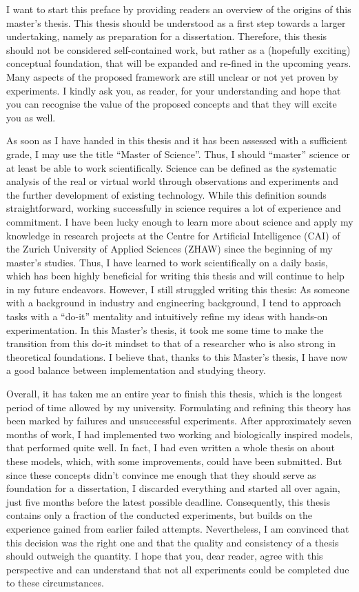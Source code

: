 \small
I want to start this preface by providing readers an overview of the origins of this master's thesis.
This thesis should be understood as a first step towards a larger undertaking, namely as preparation for a dissertation.
Therefore, this thesis should not be considered self-contained work, but rather as a (hopefully exciting) conceptual foundation,  that will be expanded and re-fined in the upcoming years.
Many aspects of the proposed framework are still unclear or not yet proven by experiments.
I kindly ask you, as reader, for your understanding and hope that you can recognise the value of the proposed concepts and that they will excite you as well.

As soon as I have handed in this thesis and it has been assessed with a sufficient grade, I may use the title ``Master of Science''.
Thus, I should ``master'' science or at least be able to work scientifically.
Science can be defined as the systematic analysis of the real or virtual world through observations and experiments and the further development of existing technology.
While this definition sounds straightforward, working successfully in science requires a lot of experience and commitment.
I have been lucky enough to learn more about science and apply my knowledge in research projects at the Centre for Artificial Intelligence (CAI) of the Zurich University of Applied Sciences (ZHAW) since the beginning of my master's studies.
Thus, I have learned to work scientifically on a daily basis, which has been highly beneficial for writing this thesis and will continue to help in my future endeavors.
However, I still struggled writing this thesis:
As someone with a background in industry and engineering background, I tend to approach tasks with a ``do-it'' mentality and intuitively refine my ideas with hands-on experimentation. 
In this Master's thesis, it took me some time to make the transition from this do-it mindset to that of a researcher who is also strong in theoretical foundations. I believe that, thanks to this Master's thesis, I have now a good balance between implementation and studying theory.

Overall, it has taken me an entire year to finish this thesis, which is the longest period of time allowed by my university.
Formulating and refining this theory has been marked by failures and unsuccessful experiments.
After approximately seven months of work, I had implemented two working and biologically inspired models, that performed quite well.
In fact, I had even written a whole thesis on about these models, which, with some improvements, could have been submitted.
But since these concepts didn't convince me enough that they should serve as foundation for a dissertation, I discarded everything and started all over again, just five months before the latest possible deadline.
Consequently, this thesis contains only a fraction of the conducted experiments, but builds on the experience gained from earlier failed attempts.
Nevertheless, I am convinced that this decision was the right one and that the quality and consistency of a thesis should outweigh the quantity.
I hope that you, dear reader, agree with this perspective and can understand that not all experiments could be completed due to these circumstances.

